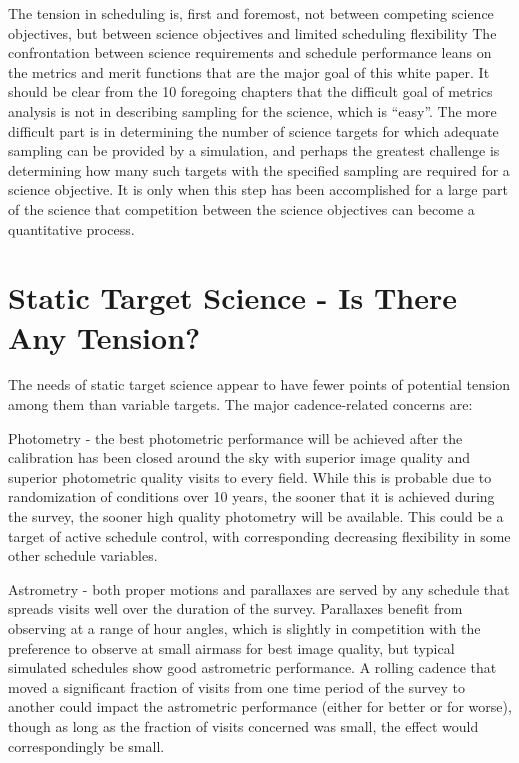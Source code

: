 The tension in scheduling is, first and foremost, not between competing
science objectives, but between science objectives and limited
scheduling flexibility The confrontation between science requirements
and schedule performance leans on the metrics and merit functions that
are the major goal of this white paper.  It should be clear from the 10
foregoing chapters that the difficult goal of metrics analysis is not in
describing sampling for the science, which is ``easy''.  The more
difficult part is in determining the number of science targets for which
adequate sampling can be provided by a simulation, and perhaps the
greatest challenge is determining how many such targets with the
specified sampling are required for a science objective.  It is only
when this step has been accomplished for a large part of the science
that competition between the science objectives can become a
quantitative process.


\section{Static Target Science - Is There Any Tension?}

The needs of static target science appear to have fewer points of
potential tension among them than variable targets.  The major
cadence-related concerns are:

Photometry - the best photometric performance will be achieved after the
calibration has been closed around the sky with superior image quality
and superior photometric quality visits to every field.  While this is
probable due to randomization of conditions over 10 years, the sooner
that it is achieved during the survey, the sooner high quality
photometry will be available.  This could be a target of active schedule
control, with corresponding decreasing flexibility in some other
schedule variables.

Astrometry - both proper motions and parallaxes are served by any
schedule that spreads visits well over the duration of the survey.
Parallaxes benefit from observing at a range of hour angles, which is
slightly in competition with the preference to observe at small airmass
for best image quality, but typical simulated schedules show good
astrometric performance. A rolling cadence that moved a significant
fraction of visits from one time period of the survey to another could
impact the astrometric performance (either for better or for worse),
though as long as the fraction of visits concerned was small, the effect
would correspondingly be small.

